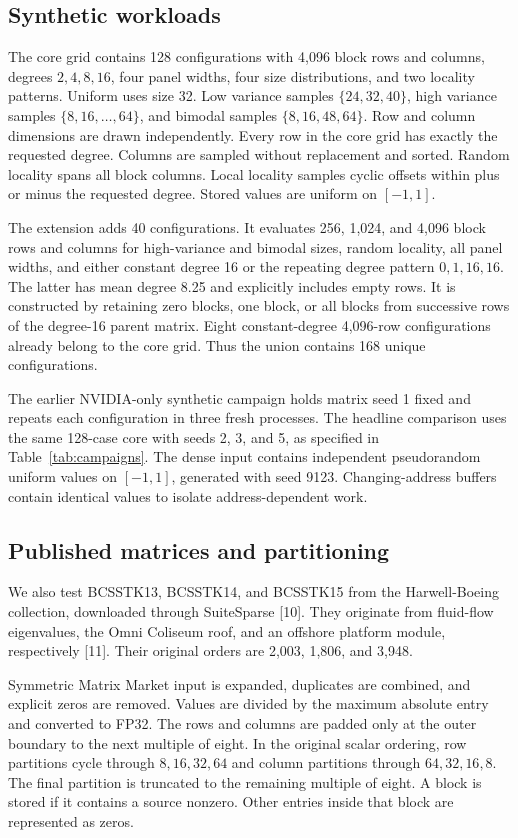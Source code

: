 \documentclass[10pt]{article}
\begin{document}
\subsection{Synthetic workloads}
The core grid contains 128 configurations with 4,096 block rows and columns,
degrees \(2,4,8,16\), four panel widths, four size distributions, and two
locality patterns. Uniform uses size 32. Low variance samples
\(\{24,32,40\}\), high variance samples \(\{8,16,\ldots,64\}\), and bimodal
samples \(\{8,16,48,64\}\). Row and column dimensions are drawn independently.
Every row in the core grid has exactly the requested degree. Columns are
sampled without replacement and sorted. Random locality spans all block
columns. Local locality samples cyclic offsets within plus or minus the
requested degree. Stored values are uniform on \([-1,1]\).

The extension adds 40 configurations. It evaluates 256, 1,024, and 4,096
block rows and columns for high-variance and bimodal sizes, random locality,
all panel widths, and either constant degree 16 or the repeating degree pattern
\(0,1,16,16\). The latter has mean degree 8.25 and explicitly includes empty
rows. It is constructed by retaining zero blocks, one block, or all blocks
from successive rows of the degree-16 parent matrix. Eight constant-degree
4,096-row configurations already belong to the core grid. Thus the union
contains 168 unique configurations.

The earlier NVIDIA-only synthetic campaign holds matrix seed 1 fixed and
repeats each configuration in three fresh processes. The headline comparison
uses the same 128-case core with seeds 2, 3, and 5, as specified in
Table~\ref{tab:campaigns}. The dense input contains independent pseudorandom
uniform values on \([-1,1]\), generated with seed 9123. Changing-address
buffers contain identical values to isolate address-dependent work.

\subsection{Published matrices and partitioning}
We also test BCSSTK13, BCSSTK14, and BCSSTK15 from the Harwell-Boeing
collection, downloaded through SuiteSparse [10]. They originate from fluid-flow
eigenvalues, the Omni Coliseum roof, and an offshore platform module,
respectively [11]. Their original orders are 2,003, 1,806, and 3,948.

Symmetric Matrix Market input is expanded, duplicates are combined, and
explicit zeros are removed. Values are divided by the maximum absolute
entry and converted to FP32. The rows and columns are padded only at the
outer boundary to the next multiple of eight. In the original scalar ordering,
row partitions cycle through \(8,16,32,64\) and column partitions through
\(64,32,16,8\). The final partition is truncated to the remaining multiple
of eight. A block is stored if it contains a source nonzero. Other entries
inside that block are represented as zeros.
\end{document}
